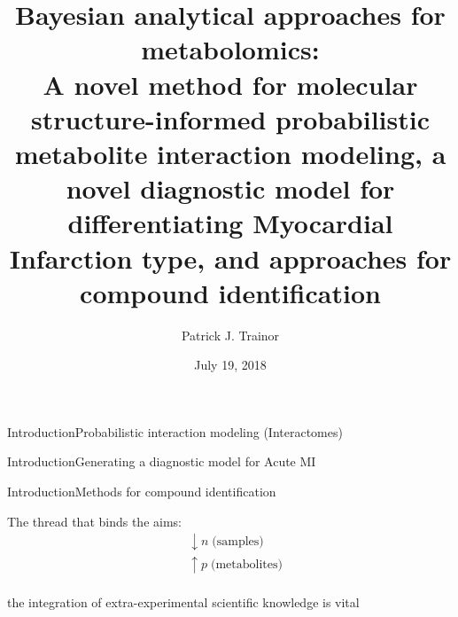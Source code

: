 \documentclass[xcolor=dvipsnames]{beamer}
\begin{document}
	
\title[Bayesian Methods for Metabolomics]{{\bf Bayesian analytical approaches for metabolomics:}\\ {\small A novel method for molecular structure-informed probabilistic metabolite interaction modeling, a novel diagnostic model for differentiating Myocardial Infarction type, and approaches for compound identification}}
\author[P.J. Trainor]{Patrick J. Trainor}
\date[July 2018]{July 19, 2018}

\begin{frame}
	\titlepage
\end{frame}

\begin{frame}{Introduction}{Probabilistic interaction modeling (Interactomes)}
	\vspace{-15pt}
	\begin{center}
	\end{center}
\end{frame}

\begin{frame}{Introduction}{Generating a diagnostic model for Acute MI}
	\vspace{-15pt}
	\begin{center}
	\end{center}
\end{frame}

\begin{frame}{Introduction}{Methods for compound identification}
	\vspace{-15pt}
	\begin{center}
	\end{center}
\end{frame}

\begin{frame}{}{}
	\vspace{-15pt}
	{\Huge
	The thread that binds the aims:
	\begin{align*}
		&\downarrow n \; \text{(samples)} \\
		&\uparrow p  \; \text{(metabolites)}
	\end{align*}}
	{\LARGE \\the integration of extra-experimental scientific knowledge is vital}

\end{frame}
\end{document}
